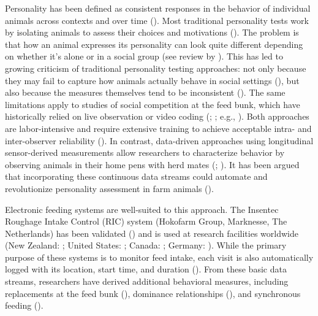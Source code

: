 \documentclass[
]{article}
\begin{document}
Personality has been defined as consistent responses in the behavior of
individual animals across contexts and over time
(). Most traditional
personality tests work by isolating animals to assess their choices and
motivations (). The problem is
that how an animal expresses its personality can look quite different
depending on whether it's alone or in a social group (see review by
). This has
led to growing criticism of traditional personality testing approaches:
not only because they may fail to capture how animals actually behave in
social settings (), but also because
the measures themselves tend to be inconsistent
(). The same
limitations apply to studies of social competition at the feed bunk,
which have historically relied on live observation or video coding
(;
; e.g.,
). Both
approaches are labor-intensive and require extensive training to achieve
acceptable intra- and inter-observer reliability
(). In contrast,
data-driven approaches using longitudinal sensor-derived measurements
allow researchers to characterize behavior by observing animals in their
home pens with herd mates (; ). It has been
argued that incorporating these continuous data streams could automate
and revolutionize personality assessment in farm animals
().

Electronic feeding systems are well-suited to this approach. The
Insentec Roughage Intake Control (RIC) system (Hokofarm Group,
Marknesse, The Netherlands) has been validated
() and is
used at research facilities worldwide (New Zealand:
; United States:
; Canada:
; Germany:
). While the primary purpose
of these systems is to monitor feed intake, each visit is also
automatically logged with its location, start time, and duration
(). From these
basic data streams, researchers have derived additional behavioral
measures, including replacements at the feed bunk
(), dominance
relationships (),
and synchronous feeding ().
\end{document}

